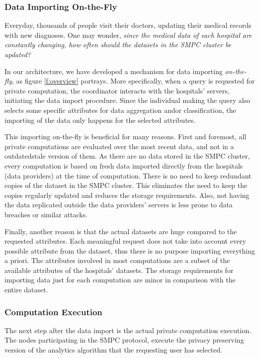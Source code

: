 \subsubsection{Data Importing On-the-Fly}\label{sss:importing-otf}
Everyday, thousands of people visit their doctors, updating their medical records with new diagnoses.
One may wonder, \textit{since the medical data of each hospital are constantly changing, how often should the datasets in the SMPC cluster be updated?}

In our architecture, we have developed a mechanism for data importing \textit{on-the-fly}, as figure \ref{f:overview} portrays.
More specifically, when a query is requested for private computation, the coordinator interacts with the hospitals' servers, initiating the data import procedure.
Since the individual making the query also selects some specific attributes for data aggregation and\myslash or classification, the importing of the data only happens for the selected attributes.

This importing on-the-fly is beneficial for many reasons.
First and foremost, all private computations are evaluated over the most recent data, and not in a outdated\myslash stale version of them.
As there are no data stored in the SMPC cluster, every computation is based on fresh data imported directly from the hospitals (data providers) at the time of computation.
There is no need to keep redundant copies of the dataset in the SMPC cluster.
This eliminates the need to keep the copies regularly updated and reduces the storage requirements.
Also, not having the data replicated outside the data providers' servers is less prone to data breaches or similar attacks.

Finally, another reason is that the actual datasets are huge compared to the requested attributes.
Each meaningful request does not take into account every possible attribute from the dataset, thus there is no purpose importing everything a priori.
The attributes involved in most computations are a subset of the available attributes of the hospitals' datasets.
The storage requirements for importing data just for each computation are minor in comparison with the entire dataset.


\subsubsection{Computation Execution}\label{sss:computation-execution}
The next step after the data import is the actual private computation execution.
The nodes participating in the SMPC protocol, execute the privacy preserving version of the analytics algorithm that the requesting user has selected.

